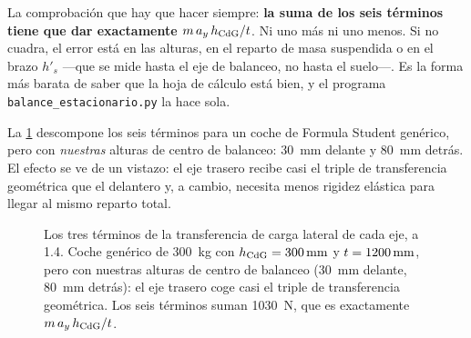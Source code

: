 \begin{clave}
La comprobación que hay que hacer siempre: \textbf{la suma de los seis términos
tiene que dar exactamente $m\,a_y\,h_{\mathrm{CdG}}/t$}. Ni uno más ni uno menos. Si no
cuadra, el error está en las alturas, en el reparto de masa suspendida o en el
brazo $h'_s$ ---que se mide hasta el eje de balanceo, no hasta el suelo---. Es
la forma más barata de saber que la hoja de cálculo está bien, y el programa
\texttt{balance\_estacionario.py} la hace sola.
\end{clave}

La \cref{fig:estacionario:terminos} descompone los seis términos para un coche
de Formula Student genérico, pero con \emph{nuestras} alturas de centro de
balanceo: \SI{30}{\milli\meter} delante y \SI{80}{\milli\meter} detrás. El
efecto se ve de un vistazo: el eje trasero recibe casi el triple de
transferencia geométrica que el delantero y, a cambio, necesita menos rigidez
elástica para llegar al mismo reparto total.

\begin{figure}[htbp]
\centering
{}
\caption[Descomposición de la transferencia de carga lateral]{Los tres términos
de la transferencia de carga lateral de cada eje, a \SI{1.4}{\gacc}. Coche
genérico de \SI{300}{\kilogram} con $h_{\mathrm{CdG}} = \SI{300}{\milli\meter}$ y
$t = \SI{1200}{\milli\meter}$, pero con nuestras alturas de centro de
balanceo (\SI{30}{\milli\meter} delante, \SI{80}{\milli\meter} detrás): el eje
trasero coge casi el triple de transferencia geométrica. Los seis términos
suman \SI{1030}{\newton}, que es exactamente $m\,a_y\,h_{\mathrm{CdG}}/t$.}
\label{fig:estacionario:terminos}
\end{figure}

